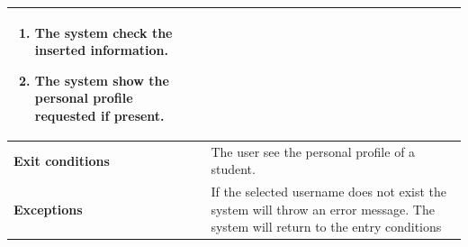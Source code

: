 \begin{enumerate}[label=\textbf{UC.\arabic*}]
\begin{table}[H]
\begin{tabular}{|m{3.2cm}|m{9.8cm}|}
\begin{enumerate}[label=\arabic*.]
                        \item The system check the inserted information.
                        \item The system show the personal profile requested if present.
                    \end{enumerate}\\ 
                    \hline
                    \textbf{Exit conditions}  & The user see the personal profile of a student. \\
                    \hline
                    \textbf{Exceptions} & If the selected username does not exist the system will throw an error message. The system will return to the entry conditions \\
                    \hline
                \end{tabular}
        \end{table}
    \end{enumerate}
    

